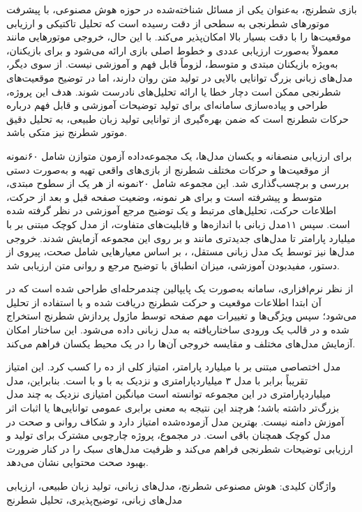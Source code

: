 بازی شطرنج، به‌عنوان یکی از مسائل شناخته‌شده در حوزه هوش مصنوعی، با پیشرفت موتورهای شطرنجی به سطحی از دقت رسیده است که تحلیل تاکتیکی و ارزیابی موقعیت‌ها را با دقت بسیار بالا امکان‌پذیر می‌کند. با این حال، خروجی موتورهایی مانند  معمولاً به‌صورت ارزیابی عددی و خطوط اصلی بازی ارائه می‌شود و برای بازیکنان، به‌ویژه بازیکنان مبتدی و متوسط، لزوماً قابل فهم و آموزشی نیست. از سوی دیگر، مدل‌های زبانی بزرگ توانایی بالایی در تولید متن روان دارند، اما در توضیح موقعیت‌های شطرنجی ممکن است دچار خطا یا ارائه تحلیل‌های نادرست شوند. هدف این پروژه، طراحی و پیاده‌سازی سامانه‌ای برای تولید توضیحات آموزشی و قابل فهم درباره حرکات شطرنج است که ضمن بهره‌گیری از توانایی تولید زبان طبیعی، به تحلیل دقیق موتور شطرنج نیز متکی باشد.

برای ارزیابی منصفانه و یکسان مدل‌ها، یک مجموعه‌داده آزمون متوازن شامل ۶۰نمونه از موقعیت‌ها و حرکات مختلف شطرنج از بازی‌های واقعی تهیه و به‌صورت دستی بررسی و برچسب‌گذاری شد. این مجموعه شامل ۲۰نمونه از هر یک از سطوح مبتدی، متوسط و پیشرفته است و برای هر نمونه، وضعیت صفحه قبل و بعد از حرکت، اطلاعات حرکت، تحلیل‌های مرتبط و یک توضیح مرجع آموزشی در نظر گرفته شده است. سپس ۱۱مدل زبانی با اندازه‌ها و قابلیت‌های متفاوت، از مدل کوچک مبتنی بر  با  میلیارد پارامتر تا مدل‌های جدیدتری مانند  و بر روی این مجموعه آزمایش شدند. خروجی مدل‌ها نیز توسط یک مدل زبانی مستقل، ، بر اساس معیارهایی شامل صحت، پیروی از دستور، مفیدبودن آموزشی، میزان انطباق با توضیح مرجع و روانی متن ارزیابی شد.

از نظر نرم‌افزاری، سامانه به‌صورت یک پایپالین چندمرحله‌ای طراحی شده است که در آن ابتدا اطلاعات موقعیت و حرکت شطرنج دریافت شده و با استفاده از تحلیل می‌شود؛ سپس ویژگی‌ها و تغییرات مهم صفحه توسط ماژول پردازش شطرنج استخراج شده و در قالب یک ورودی ساختاریافته به مدل زبانی داده می‌شود. این ساختار امکان آزمایش مدل‌های مختلف و مقایسه خروجی آن‌ها را در یک محیط یکسان فراهم می‌کند.

مدل اختصاصی مبتنی بر  با  میلیارد پارامتر، امتیاز کلی  از ده را کسب کرد. این امتیاز تقریباً برابر با مدل ۳ میلیاردپارامتری  و نزدیک به  با  و  با  است. بنابراین، مدل  میلیاردپارامتری در این مجموعه توانسته است میانگین امتیازی نزدیک به چند مدل بزرگ‌تر داشته باشد؛ هرچند این نتیجه به معنی برابری عمومی توانایی‌ها یا اثبات اثر آموزش دامنه نیست. بهترین مدل آزموده‌شده امتیاز  دارد و شکاف روانی و صحت در مدل کوچک همچنان باقی است. در مجموع، پروژه چارچوبی مشترک برای تولید و ارزیابی توضیحات شطرنجی فراهم می‌کند و ظرفیت مدل‌های سبک را در کنار ضرورت بهبود صحت محتوایی نشان می‌دهد.

واژگان کلیدی: هوش مصنوعی شطرنج، مدل‌های زبانی، تولید زبان طبیعی، ارزیابی مدل‌های زبانی، توضیح‌پذیری، تحلیل شطرنج